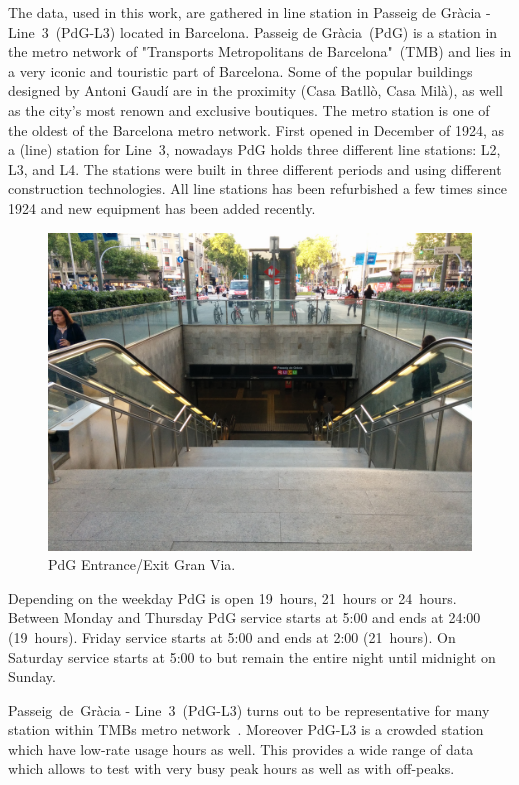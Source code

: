 The data, used in this work, are gathered in line station in Passeig de Gr\`{a}cia - Line~3~(PdG-L3) located in Barcelona. Passeig de Gr\`{a}cia~(PdG) is a station in the metro network of "Transports Metropolitans de Barcelona"~(TMB) and lies in a very iconic and touristic part of Barcelona. Some of the popular buildings designed by Antoni Gaud\'{i} are in the proximity (Casa Batll\`{o}, Casa Mil\`{a}), as well as the city's most renown and exclusive boutiques.
The metro station is one of the oldest of the Barcelona metro network. First opened in December of 1924, as a (line) station for Line~3, nowadays PdG holds three different line stations: L2, L3, and L4. The stations were built in three different periods and using different construction technologies. All line stations has been refurbished a few times since 1924 and new equipment has been added recently.

\begin{figure}[htb]
  \centering
  \includegraphics[width=\linewidth]{Figures/PdG-L3_entranceExit.jpg} 
  \caption{PdG Entrance/Exit Gran Via. \cite{TMB_2014}}
  \label{fig:PdG_entranceExit}
\end{figure}

Depending on the weekday PdG is open 19~hours, 21~hours or 24~hours. Between Monday and Thursday PdG service starts at 5:00 and ends at 24:00 (19~hours). Friday service starts at 5:00 and ends at 2:00 (21~hours). On Saturday service starts at 5:00 to but remain the entire night until midnight on Sunday.

Passeig~de~Gr\`{a}cia - Line~3~(PdG-L3) turns out to be representative for many station within TMBs metro network~\cite{TMB}. Moreover PdG-L3 is a crowded station which have low-rate usage hours as well. This provides a wide range of data which allows to test with very busy peak hours as well as with off-peaks.

